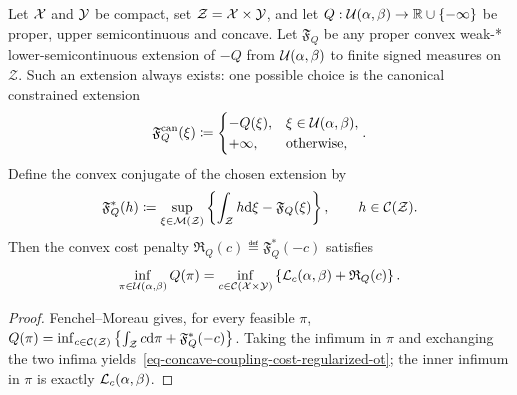 \begin{prop}\label{prop-concave-coupling-cost-regularized-ot}
	Let $\mathcal{X}$ and $\mathcal{Y}$ be compact, set $\mathcal Z=\mathcal{X}\times\mathcal{Y}$, and let $Q:\mathcal{U}(\alpha,\beta)\to\mathbb{R}\cup\{-\infty\}$ be proper, upper semicontinuous and concave. Let $\mathfrak F_Q$ be any proper convex weak-* lower-semicontinuous extension of $-Q$ from $\mathcal{U}(\alpha,\beta)$ to finite signed measures on $\mathcal Z$. Such an extension always exists: one possible choice is the canonical constrained extension
	\[
		\mathfrak F_Q^{\mathrm{can}}(\xi)
		\coloneqq
		\begin{cases}
			-Q(\xi), & \xi\in\mathcal{U}(\alpha,\beta),\\
			+\infty, & \text{otherwise},
		\end{cases}.
	\]
	Define the convex conjugate of the chosen extension by
	\[
		\mathfrak F_Q^*(h)
		\coloneqq
		\sup_{\xi\in\mathcal{M}(\mathcal Z)}
		\left\{\int_{\mathcal Z}h\mathrm{d}\xi-\mathfrak F_Q(\xi)\right\},
		\qquad h\in\mathcal{C}(\mathcal Z).
	\]
	Then the convex cost penalty $\mathfrak R_Q(c)\eqdef\mathfrak F_Q^*(-c)$ satisfies
	\begin{equation}\label{eq-concave-coupling-cost-regularized-ot}
		\inf_{\pi\in\mathcal{U}(\alpha,\beta)}Q(\pi)
		=
		\inf_{c\in\mathcal{C}(\mathcal{X}\times\mathcal{Y})}
		\left\{\mathcal{L}_c(\alpha,\beta)+\mathfrak R_Q(c)\right\}.
	\end{equation}
\end{prop}
\begin{proof}
	Fenchel--Moreau gives, for every feasible $\pi$,
	$Q(\pi) = \inf_{c\in\mathcal{C}(\mathcal Z)} \left\{\int_{\mathcal Z}c\mathrm{d}\pi+\mathfrak F_Q^*(-c)\right\}$.
	Taking the infimum in $\pi$ and exchanging the two infima yields~\eqref{eq-concave-coupling-cost-regularized-ot}; the inner infimum in $\pi$ is exactly $\mathcal{L}_c(\alpha,\beta)$.
\end{proof}

